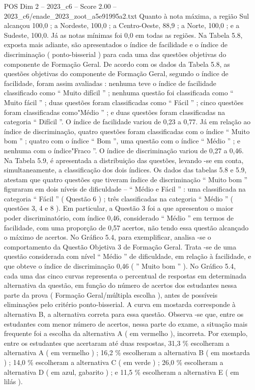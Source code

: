\begin{textsample}{POS Dim 2 – 2023\_c6 – Score 2.00 – 2023\_c6/enade\_2023\_zoot\_a5e91995a2.txt}
Quanto à nota máxima, a região Sul alcançou 100,0 ; a Nordeste, 100,0 ; a Centro-Oeste, 88,9 ; a Norte, 100,0 ; e a Sudeste, 100,0.
Já as notas mínimas foi 0,0 em todas as regiões.
Na Tabela 5.8, exposta mais adiante, são apresentados o índice de facilidade e o índice de discriminação ( ponto-bisserial ) para cada uma das questões objetivas do componente de Formação Geral.
De acordo com os dados da Tabela 5.8, as questões objetivas do componente de Formação Geral, segundo o índice de facilidade, foram assim avaliadas : nenhuma teve o índice de facilidade classificado como “ Muito difícil ” ; nenhuma questão foi classificada como “ Muito fácil ” ; duas questões foram classificadas como “ Fácil ” ; cinco questões foram classificadas como"Médio ” ; e duas questões foram classificadas na categoria “ Difícil ”.
O índice de facilidade variou de 0,23 a 0,77.
Já em relação ao índice de discriminação, quatro questões foram classificadas com o índice “ Muito bom ” ; quatro com o índice “ Bom ”, uma questão com o índice “ Médio ” ; e nenhuma com o índice"Fraco ”.
O índice de discriminação variou de 0,27 a 0,46.
Na Tabela 5.9, é apresentada a distribuição das questões, levando -se em conta, simultaneamente, a classificação dos dois índices.
Os dados das tabelas 5.8 e 5.9, atestam que quatro questões que tiveram índice de discriminação “ Muito bom ” figuraram em dois níveis de dificuldade – “ Médio e Fácil ” : uma classificada na categoria “ Fácil ” ( Questão 6 ) ; três classificadas na categoria “ Médio ” ( questões 3, 4 e 8 ).
Em particular, a Questão 3 foi a que apresentou o maior poder discriminatório, com índice 0,46, considerado “ Médio ” em termos de facilidade, com uma proporção de 0,57 acertos, não tendo essa questão alcançado o máximo de acertos.
No Gráfico 5.4, para exemplificar, analisa -se o comportamento da Questão Objetiva 3 de Formação Geral.
Trata -se de uma questão considerada com nível “ Médio ” de dificuldade, em relação à facilidade, e que obteve o índice de discriminação 0,46 ( ” Muito bom ” ).
No Gráfico 5.4, cada uma das cinco curvas representa o percentual de respostas em determinada alternativa da questão, em função do número de acertos dos estudantes nessa parte da prova ( Formação Geral/múltipla escolha ), antes de possíveis eliminações pelo critério ponto-bisserial.
A curva em mostarda corresponde à alternativa B, a alternativa correta para essa questão.
Observa -se que, entre os estudantes com menor número de acertos, nessa parte do exame, a situação mais frequente foi a escolha da alternativa A ( em vermelho ), incorreta.
Por exemplo, entre os estudantes que acertaram até duas respostas, 31,3 \% escolheram a alternativa A ( em vermelho ) ; 16,2 \% escolheram a alternativa B ( em mostarda ) ; 14,0 \% escolheram a alternativa C ( em verde ) ; 26,0 \% escolheram a alternativa D ( em azul, gabarito ) ; e 11,5 \% escolheram a alternativa E ( em lilás ).

\end{textsample}
